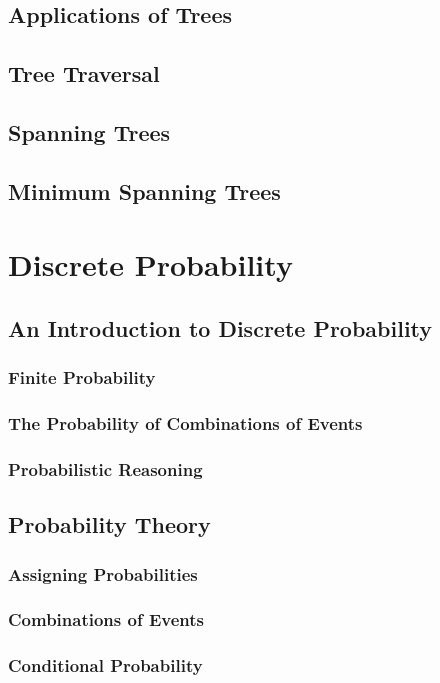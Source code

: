 \documentclass[11pt]{book} %
\theoremstyle {definition}
\theoremstyle {remark}
\begin{document}
\section {Applications of Trees}
\section {Tree Traversal}
\section {Spanning Trees}
\section {Minimum Spanning Trees}

\newpage

\chapter {Discrete Probability}
\section {An Introduction to Discrete Probability}
    \subsection {Finite Probability}
    \subsection {The Probability of Combinations of Events}
    \subsection {Probabilistic Reasoning}

\section {Probability Theory}
    \subsection {Assigning Probabilities}
    \subsection {Combinations of Events}
    \subsection {Conditional Probability}
\end{document}
